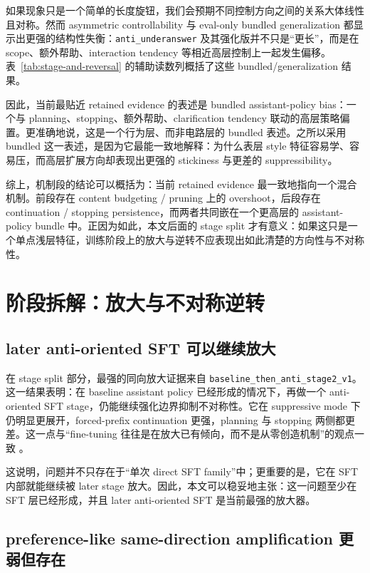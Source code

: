 \documentclass[12pt]{ctexart}
\begin{document}
如果现象只是一个简单的长度旋钮，我们会预期不同控制方向之间的关系大体线性且对称。然而 asymmetric controllability 与 eval-only bundled generalization 都显示出更强的结构性失衡：\texttt{anti\_underanswer} 及其强化版并不只是“更长”，而是在 scope、额外帮助、interaction tendency 等相近高层控制上一起发生偏移。表~\ref{tab:stage-and-reversal} 的辅助读数列概括了这些 bundled/generalization 结果。

因此，当前最贴近 retained evidence 的表述是 bundled assistant-policy bias：一个与 planning、stopping、额外帮助、clarification tendency 联动的高层策略偏置。更准确地说，这是一个行为层、而非电路层的 bundled 表述。之所以采用 bundled 这一表述，是因为它最能一致地解释：为什么表层 style 特征容易学、容易压，而高层扩展方向却表现出更强的 stickiness 与更差的 suppressibility。

综上，机制段的结论可以概括为：当前 retained evidence 最一致地指向一个混合机制。前段存在 content budgeting / pruning 上的 overshoot，后段存在 continuation / stopping persistence，而两者共同嵌在一个更高层的 assistant-policy bundle 中。正因为如此，本文后面的 stage split 才有意义：如果这只是一个单点浅层特征，训练阶段上的放大与逆转不应表现出如此清楚的方向性与不对称性。

\section{阶段拆解：放大与不对称逆转}
\label{sec:stages}

\subsection{later anti-oriented SFT 可以继续放大}

在 stage split 部分，最强的同向放大证据来自 \texttt{baseline\_then\_anti\_stage2\_v1}。这一结果表明：在 baseline assistant policy 已经形成的情况下，再做一个 anti-oriented SFT stage，仍能继续强化边界抑制不对称性。它在 suppressive mode 下仍明显更展开，forced-prefix continuation 更强，planning 与 stopping 两侧都更差。这一点与“fine-tuning 往往是在放大已有倾向，而不是从零创造机制”的观点一致 \citep{zhou2023lima,prakash2024finetuning}。

这说明，问题并不只存在于“单次 direct SFT family”中；更重要的是，它在 SFT 内部就能继续被 later stage 放大。因此，本文可以稳妥地主张：这一问题至少在 SFT 层已经形成，并且 later anti-oriented SFT 是当前最强的放大器。

\subsection{preference-like same-direction amplification 更弱但存在}
\end{document}
